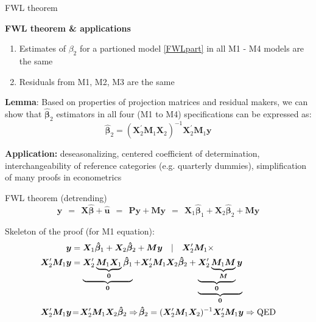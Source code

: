 \documentclass{beamer}
\begin{document}

\begin{frame}{FWL theorem}

\textbf{FWL theorem \& applications}

\begin{enumerate}
\item Estimates of $\beta_2$ for a partioned model \eqref{FWLpart} in all M1 - M4 models are the same
\item Residuals from M1, M2, M3 are the same
\end{enumerate}
\vspace{0.5cm}
\textbf{Lemma}: Based on properties of projection matrices and residual makers, we can show that  $\bm{\hat{\beta}}_2$ estimators in all four (M1 to M4) specifications can be expressed as: 
$$\bm{\hat{\beta}}_2 = (\bm{X}_2^{\prime}\bm{M}_1 \bm{X}_2)^{-1}\bm{X}_2^{\prime}\bm{M}_1\bm{y} $$

\textbf{Application:} deseasonalizing, centered coefficient of determination, interchangeability of reference categories (e.g. quarterly dummies), simplification of many proofs in econometrics
\end{frame}

%
\begin{frame}{FWL theorem (detrending)}
$$\bm{y} ~~=~~ 
\bm{X}\hat{\bm{\beta}} + \hat{\bm{u}} ~~ = 
~~ 
\bm{Py} + \bm{My} ~~ =
~~ 
\bm{X}_1\hat{\bm{\beta}}_1+\bm{X}_2\hat{\bm{\beta}}_2+\bm{My}$$
\begin{block}{Skeleton of the proof (for M1 equation):}
\vspace{-0.3cm}
\begin{align*}
\bm{y} & = \bm{X}_1 \bm{\hat{\beta}}_1+ \bm{X}_2\bm{\hat{\beta}}_2+\bm{M}\bm{y} \quad
| \quad \bm{X}^{\prime}_2\bm{M}_1 \times \\
\bm{X}^{\prime}_2\bm{M}_1\bm{y} & = \underbrace{\bm{X}^{\prime}_2\underbrace{\bm{M}_1\bm{X}_1}_{\bm{0}} \bm{\hat{\beta}}_1}_{\bm{0}}+ \bm{X}^{\prime}_2\bm{M}_1\bm{X}_2\bm{\hat{\beta}}_2+ \underbrace{\underbrace{\bm{X}^{\prime}_2\underbrace{\bm{M}_1\bm{M}}_{\bm{M}}}_{\bm{0}}\bm{y}}_{\bm{0}}\\
\bm{X}^{\prime}_2\bm{M}_1\bm{y} & \! = \! \bm{X}^{\prime}_2\bm{M}_1\bm{X}_2\bm{\hat{\beta}}_2 \Rightarrow \! \bm{\hat{\beta}}_2 = (\bm{X}^{\prime}_2\bm{M}_1\bm{X}_2)^{-1}\bm{X}^{\prime}_2\bm{M}_1\bm{y}\Rightarrow \textnormal{QED}
\end{align*}
\end{block}
\end{frame}
\end{document}
